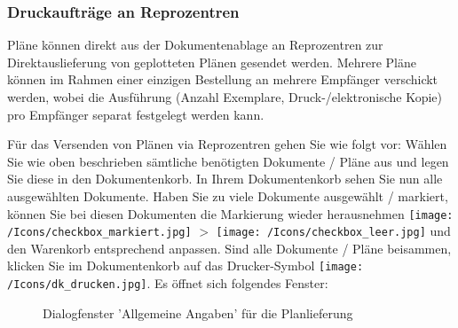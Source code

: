 \subsubsection{Druckaufträge an Reprozentren}
\label{bkm:Ref20170609127}

Pläne können direkt aus der Dokumentenablage an Reprozentren zur Direktauslieferung von geplotteten Plänen gesendet werden. Mehrere Pläne können im Rahmen einer einzigen Bestellung an mehrere Empfänger verschickt werden, wobei die Ausführung (Anzahl Exemplare, Druck-/elektronische Kopie) pro Empfänger separat festgelegt werden kann.

\vspace{\baselineskip}

Für das Versenden von Plänen via Reprozentren gehen Sie wie folgt vor: Wählen Sie wie oben beschrieben sämtliche benötigten Dokumente / Pläne aus und legen Sie diese in den Dokumentenkorb. In Ihrem Dokumentenkorb sehen Sie nun alle ausgewählten Dokumente. Haben Sie zu viele Dokumente ausgewählt / markiert, können Sie bei diesen Dokumenten die Markierung wieder herausnehmen \texttt{[image: /Icons/checkbox\_markiert.jpg]} $ > $ \texttt{[image: /Icons/checkbox\_leer.jpg]} und den Warenkorb entsprechend anpassen. Sind alle Dokumente / Pläne beisammen, klicken Sie im Dokumentenkorb auf das Drucker-Symbol \texttt{[image: /Icons/dk\_drucken.jpg]}. Es öffnet sich folgendes Fenster:

\begin{figure}[H]
\caption{Dialogfenster 'Allgemeine Angaben' für die Planlieferung}
\end{figure}

